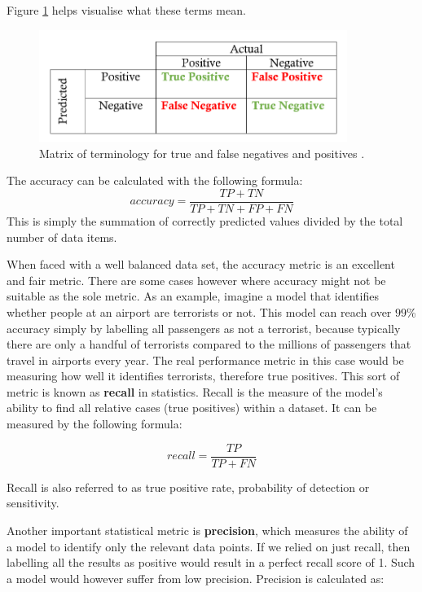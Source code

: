 \documentclass{UoYCSproject}
\begin{document}
Figure \ref{fig:tptnfpfn} helps visualise what these terms mean.

\begin{figure}[h]
\includegraphics[width=10cm]{tptnfpfn.png}
\centering
\caption{Matrix of terminology for true and false negatives and positives \cite{precisionandrecall}.} 
\label{fig:tptnfpfn}
\end{figure}

The accuracy can be calculated with the following formula: 
\begin{equation}
\label{eq:accuracy}
accuracy=\frac{TP + TN}{TP + TN + FP + FN}
\end{equation}
This is simply the summation of correctly predicted values divided by the total number of data items.

When faced with a well balanced data set, the accuracy metric is an excellent and fair metric. There are some cases however where accuracy might not be suitable as the sole metric. As an example, imagine a model that identifies whether people at an airport are terrorists or not. This model can reach over $99$\% accuracy simply by labelling all passengers as not a terrorist, because typically there are only a handful of terrorists compared to the millions of passengers that travel in airports every year. The real performance metric in this case would be measuring how well it identifies terrorists, therefore true positives. This sort of metric is known as \textbf{recall} in statistics. Recall is the measure of the model's ability to find all relative cases (true positives) within a dataset. It can be measured by the following formula:

\begin{equation}
recall=\frac{TP}{TP + FN}
\end{equation}

Recall is also referred to as true positive rate, probability of detection or sensitivity.  

Another important statistical metric is \textbf{precision}, which measures the ability of a model to identify only the relevant data points. If we relied on just recall, then labelling all the results as positive would result in a perfect recall score of 1. Such a model would however suffer from low precision. Precision is calculated as:
\end{document}
